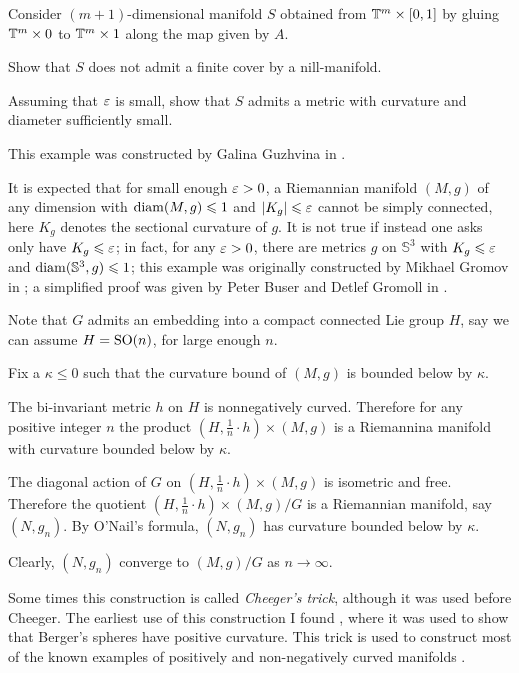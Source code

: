 Consider $(m+1)$-dimensional manifold $S$ obtained from $\mathbb{T}^m\times [0,1]$ by gluing $\mathbb{T}^m\times 0$ to $\mathbb{T}^m\times 1$ along the map given by $A$.

Show that $S$ does not admit a finite cover by a nill-manifold.

Assuming that $\varepsilon$ is small,
show that $S$ admits a metric with curvature and diameter sufficiently small.\qeds

\label{page-sol:almost-flat}
This example was constructed 
by Galina Guzhvina in \cite{guzhvina}.

It is expected that for small enough $\varepsilon>0$,
a Riemannian manifold $(M,g)$ of any dimension 
with  $\operatorname{\rm diam}(M,g)\leqslant 1$ and $|K_g|\leqslant \varepsilon$ cannot be simply connected,
here $K_g$ denotes the sectional curvature of $g$.
It is not true if instead one asks only have $K_g\leqslant \varepsilon$;
in fact, 
for any $\varepsilon>0$,
there are metrics $g$ on $\mathbb{S}^3$ 
with $K_g\leqslant \varepsilon$ and $\operatorname{\rm diam}(\mathbb{S}^3,g)\leqslant 1$; 
this example was originally constructed by Mikhael Gromov in \cite{gromov-almost-flat}; 
a simplified proof was given by 
Peter Buser
and Detlef Gromoll in \cite{buser-gromoll}.


Note that $G$ admits an embedding into a compact connected Lie group $H$, say we can assume $H=\mathrm{SO}(n)$, for large enough $n$.

Fix a $\kappa\le 0$ such that the curvature bound of $(M,g)$ is bounded below by $\kappa$.

The bi-invariant metric $h$ on $H$ is nonnegatively curved.
Therefore for any positive integer $n$ the product $(H,\tfrac1n\cdot h)\times (M,g)$ is a Riemannina manifold with  curvature bounded below by $\kappa$.

The diagonal action of $G$ on $(H,\tfrac1n\cdot h)\times (M,g)$ is        isometric and free. 
Therefore 
the quotient $(H,\tfrac1n\cdot h)\times (M,g)/G$
is a Riemannian manifold, say $(N,g_n)$.
By O'Nail's formula, $(N,g_n)$ has curvature bounded below by $\kappa$.

Clearly, $(N,g_n)$ converge to $(M,g)/G$ as $n\to \infty$.\qeds

Some times this construction is called \emph{Cheeger's trick},
although it was used before Cheeger.
The earliest use of this construction  
I found \cite{GKM}, where it was used to show that Berger's spheres have positive curvature.
This trick is used to construct most of the known examples of positively and non-negatively curved manifolds
 \cite[see][]{cheeger,aloff-wallach,gromoll-meyer,eschenburg-spaces,bazajkin}.
 
